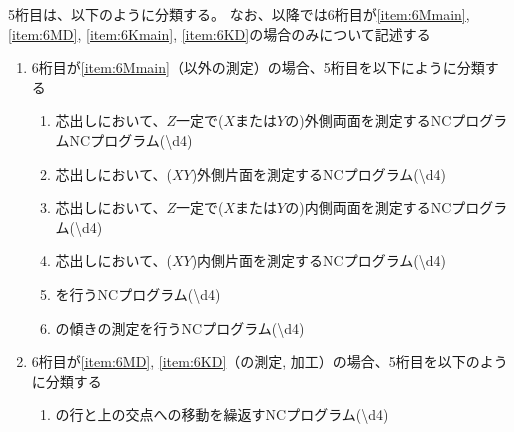\clearpage
5桁目は、以下のように分類する。
なお、以降では6桁目が\ref{item:6Mmain}, \ref{item:6MD}, \ref{item:6Kmain}, \ref{item:6KD}の場合のみについて記述する
\begin{enumerate}[label=\alph*)]
\item 6桁目が\ref{item:6Mmain}（\Dimple 以外の測定）の場合、5桁目を以下にように分類する
  \begin{enumerate}[label=\arabic*., ref=\arabic*, start=1]
  \item%
    芯出しにおいて、$Z$一定で($X$または$Y$の)外側両面を測定するNCプログラムNCプログラム({\textbackslash d{4}})
  \item%
    芯出しにおいて、($XY$)外側片面を測定するNCプログラム({\textbackslash d{4}})
  \item%
    芯出しにおいて、$Z$一定で($X$または$Y$の)内側両面を測定するNCプログラム({\textbackslash d{4}})
  \item%
    芯出しにおいて、($XY$)内側片面を測定するNCプログラム({\textbackslash d{4}})
  \item%
    \CenterlineEndFaceDifMeasurement を行うNCプログラム({\textbackslash d{4}})
  \item
    \EndFace の傾きの測定を行うNCプログラム({\textbackslash d{4}})
  \end{enumerate}
\item 6桁目が\ref{item:6MD}, \ref{item:6KD}（\Dimple の測定, 加工）の場合、5桁目を以下のように分類する
  \begin{enumerate}[label=\arabic*., ref=\arabic*]
  \item \Dimple の行と\CenterCurvatureLine 上の交点への移動を繰返すNCプログラム({\textbackslash d{4}})

\end{enumerate}
\end{enumerate}
